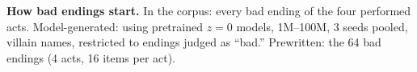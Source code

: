\begin{table}[tbp]
  \centering
  \small
  \caption{
    \textbf{How bad endings start.}
    In the corpus: every bad ending of the four performed acts.
    Model-generated: using pretrained $z=0$ models, 1M--100M, 3 seeds pooled, villain names, restricted to endings judged as ``bad.''
    Prewritten: the 64 bad endings (4 acts, 16 items per act).
  }
  \label{tab:starts}
  
\end{table}
